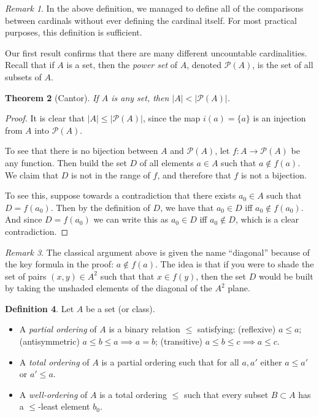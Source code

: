 \documentclass[11pt,oneside]{amsbook}
\theoremstyle{definition}
\theoremstyle{plain}
\newtheorem{thm}{Theorem}[section]
\theoremstyle{definition}
\newtheorem{defn}[thm]{Definition}
\theoremstyle{remark}
\newtheorem{rem}[thm]{Remark}
\begin{document}
\begin{rem}
  In the above definition, we managed to define all of the comparisons between cardinals without ever defining the cardinal itself. For most practical purposes, this definition is sufficient.
\end{rem}

Our first result confirms that there are many different uncountable cardinalities. Recall that if $A$ is a set, then the \emph{power set} of $A$, denoted $\mathcal P(A)$, is the set of all subsets of $A$.

\begin{thm}[Cantor]
  If $A$ is any set, then $|A|<|\mathcal P(A)|$.
\end{thm}

\begin{proof}
  It is clear that $|A|\leq|\mathcal P(A)|$, since the map $i(a)=\{a\}$ is an injection from $A$ into $\mathcal P(A)$.

  To see that there is no bijection between $A$ and $\mathcal P(A)$, let $f\colon A\to\mathcal P(A)$ be any function. Then build the set $D$ of all elements $a\in A$ such that $a\notin f(a)$. We claim that $D$ is not in the range of $f$, and therefore that $f$ is not a bijection.

  To see this, suppose towards a contradiction that there exists $a_0\in A$ such that $D=f(a_0)$. Then by the definition of $D$, we have that $a_0\in D$ iff $a_0\notin f(a_0)$. And since $D=f(a_0)$ we can write this as $a_0\in D$ iff $a_0\notin D$, which is a clear contradiction.
\end{proof}

\begin{rem}
  The classical argument above is given the name ``diagonal'' because of the key formula in the proof: $a\notin f(a)$. The idea is that if you were to shade the set of pairs $(x,y)\in A^2$ such that that $x\in f(y)$, then the set $D$ would be built by taking the unshaded elements of the diagonal of the $A^2$ plane.
\end{rem}

\begin{defn}
  Let $A$ be a set (or class).
  \begin{itemize}
  \item A \emph{partial ordering} of $A$ is a binary relation $\leq$ satisfying: (reflexive) $a\leq a$; (antisymmetric) $a\leq b\leq a\implies a=b$; (transitive) $a\leq b\leq c\implies a\leq c$.
  \item A \emph{total ordering} of $A$ is a partial ordering such that for all $a,a'$ either $a\leq a'$ or $a'\leq a$.
  \item A \emph{well-ordering} of $A$ is a total ordering $\leq$ such that every subset $B\subset A$ has a $\leq$-least element $b_0$.
  \end{itemize}
\end{defn}
\end{document}
